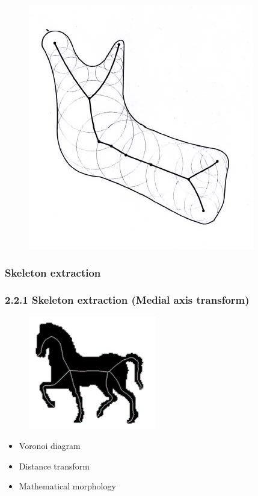 \documentclass[notheorems,serif,table,compress]{beamer}  %
\begin{document}
\begin{frame}
\begin{figure}
\begin{minipage}[t]{0.28\linewidth}
              \includegraphics[width=1\linewidth]{mat1}
              \end{minipage}
            \end{figure}
\end{frame}

\subsubsection{Skeleton extraction}
\begin{frame}
\frametitle{2.2.1 Skeleton extraction (Medial axis transform)}
            \begin{figure}
              \centering
              \includegraphics[width=0.4\linewidth]{skeleton} 
            \end{figure}
    \begin{itemize}
        \item Voronoi diagram
        \item Distance transform
        \item Mathematical morphology
    \end{itemize}
\end{frame}
\end{document}

